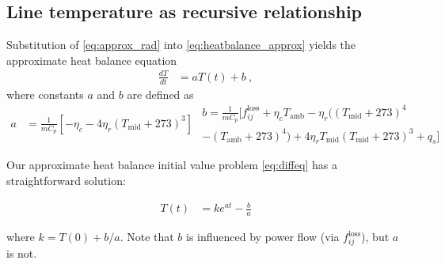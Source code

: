 \documentclass[conference]{IEEEtran}
\begin{document}
\subsection{Line temperature as recursive relationship}
Substitution of \eqref{eq:approx_rad} into \eqref{eq:heatbalance_approx} yields the approximate heat balance equation
\begin{align}\label{eq:diffeq}
\frac{dT}{dt} &= aT(t) + b~,
\end{align}
where constants $a$ and $b$ are defined as
\begin{subequations}
\begin{align}
a &= \frac{1}{mC_p} \left[ -\eta_c - 4\eta_r(T_\text{mid} + 273)^3 \right]
\end{align}
\begin{multline}
b = \frac{1}{mC_p} \big[ f_{ij}^\text{loss} + \eta_cT_\text{amb} - \eta_r \big( (T_\text{mid} + 273)^4 \\ - (T_\text{amb} + 273)^4 \big) + 4\eta_rT_\text{mid}(T_\text{mid} + 273)^3 + q_s \big]
\end{multline}
\end{subequations}

Our approximate heat balance initial value problem \eqref{eq:diffeq} has a straightforward solution:

\begin{align}\label{eq:tivp}
T(t) &= ke^{at} - \frac{b}{a}
\end{align}

where $k=T(0) + b/a$. Note that $b$ is influenced by power flow (via
$f_{ij}^\text{loss}$), but $a$ is not.
\end{document}
